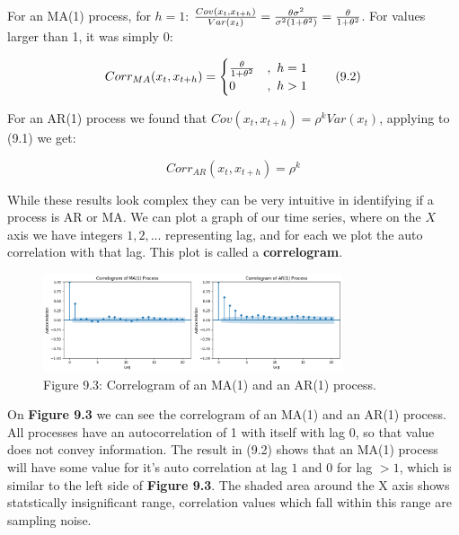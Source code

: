 For an MA(1) process, for \(h = 1\): \({Cov(x_t, x_{t+h}) \over {Var(x_t)}} = {\theta \sigma ^2 \over \sigma ^2(1 + \theta^2)} = {\theta \over 1 + \theta^2}\). For values larger than 1, it was simply 0:

\begin{equation}Corr_{MA}(x_t, x_{t+h}) = \begin{cases}
{\theta \over 1 + \theta^2} & ,\ h = 1 \\
0 & ,\ h > 1
\end{cases}  \tag{9.2}\end{equation}

For an AR(1) process we found that \(Cov(x_t, x_{t+h}) = \rho^k Var(x_t)\), applying to (9.1) we get:

\begin{equation}Corr_{AR}(x_t, x_{t+h}) = \rho^k  \tag{9.3}\end{equation}

While these results look complex they can be very intuitive in identifying if a process is AR or MA. We can plot a graph of our time series, where on the \(X\) axis we have integers \(1, 2, ...\) representing lag, and for each we plot the auto correlation with that lag. This plot is called a \textbf{correlogram}.


\begin{figure}[htbp]
    \begin{center}
        \includegraphics[width=250pt]{../img/09-ma-ar.png}
        \caption{Figure 9.3:  Correlogram of an MA(1) and an AR(1) process.}
    \end{center}
\end{figure}


On \textbf{Figure 9.3} we can see the correlogram of an MA(1) and an AR(1) process. All processes have an autocorrelation of 1 with itself with lag 0, so that value does not convey information. The result in (9.2) shows that an MA(1) process will have some value for it's auto correlation at lag \(1\) and \(0\) for lag \(>1\), which is similar to the left side of \textbf{Figure 9.3}. The shaded area around the X axis shows statstically insignificant range, correlation values which fall within this range are sampling noise.

